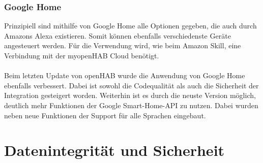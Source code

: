\subsubsection{Google Home}

Prinzipiell sind mithilfe von Google Home alle Optionen gegeben, die auch durch Amazons Alexa existieren. Somit können ebenfalls verschiedenste Geräte angesteuert werden. Für die Verwendung wird, wie beim Amazon Skill, eine Verbindung mit der myopenHAB Cloud benötigt.\\
\\
Beim letzten Update von openHAB wurde die Anwendung von Google Home ebenfalls verbessert. Dabei ist sowohl die Codequalität als auch die Sicherheit der Integration gesteigert worden. Weiterhin ist es durch die neuste Version möglich, deutlich mehr Funktionen der Google Smart-Home-API zu nutzen. Dabei wurden neben neue Funktionen der Support für alle Sprachen eingebaut.\cite{openHAB02:OH}\cite{GOOGLEH01:GH}

\section{Datenintegrität und Sicherheit}

